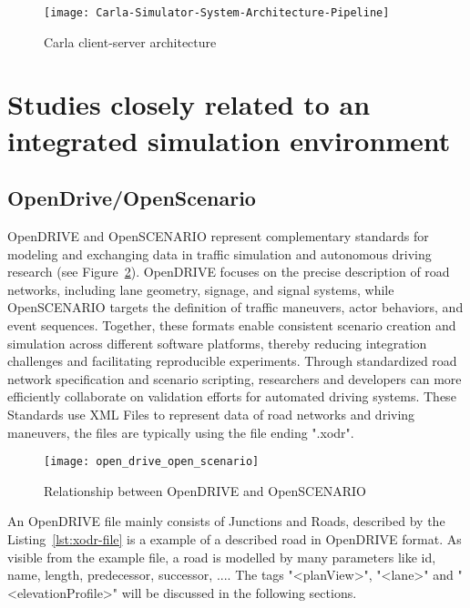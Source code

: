                 \begin{figure}[H]
                    \centering
                    \texttt{[image: Carla-Simulator-System-Architecture-Pipeline]}
                    \caption{Carla client-server architecture \cite{pirri2021towards}}
                    \label{fig:carla-architecture}
                \end{figure}

    \section{Studies closely related to an integrated simulation environment}\label{sec:studies-closely-related-to-an-integrated-simulation-environment}
        \subsection{OpenDrive/OpenScenario}\label{subsec:opendrive/openscenario}
            OpenDRIVE and OpenSCENARIO represent complementary standards for modeling and exchanging data in traffic simulation and autonomous driving research (see Figure~\ref{fig:openDRIVE-overview}).
            OpenDRIVE focuses on the precise description of road networks, including lane geometry, signage, and signal systems, while OpenSCENARIO targets the definition of traffic maneuvers, actor behaviors, and event sequences.
            Together, these formats enable consistent scenario creation and simulation across different software platforms, thereby reducing integration challenges and facilitating reproducible experiments.
            Through standardized road network specification and scenario scripting, researchers and developers can more efficiently collaborate on validation efforts for automated driving systems.
            These Standards use XML Files to represent data of road networks and driving maneuvers, the files are typically using the file ending ".xodr".


            \begin{figure}[H]
                \centering
                \texttt{[image: open\_drive\_open\_scenario]}
                \caption{Relationship between OpenDRIVE and OpenSCENARIO~\cite{openDrive}}
                \label{fig:openDRIVE-overview}
            \end{figure}

            An OpenDRIVE file mainly consists of Junctions and Roads, described by the Listing~\ref{lst:xodr-file} is a example of a described road in OpenDRIVE format.
            As visible from the example file, a road is modelled by many parameters like id, name, length, predecessor, successor, ....
            The tags "<planView>", "<lane>" and "<elevationProfile>" will be discussed in the following sections.
                
